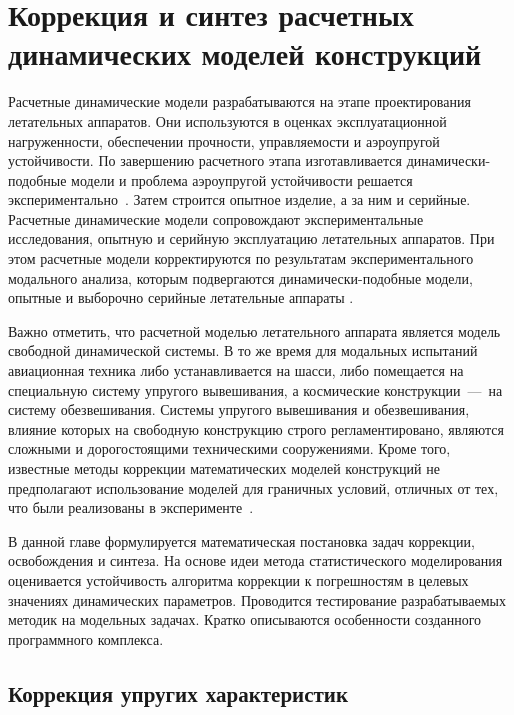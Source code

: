 \chapter{Коррекция и синтез расчетных динамических моделей конструкций}

Расчетные динамические модели разрабатываются на этапе проектирования летательных аппаратов. Они используются в оценках эксплуатационной нагруженности, обеспечении прочности, управляемости и аэроупругой устойчивости. По завершению расчетного этапа изготавливается динамически-подобные модели и проблема аэроупругой устойчивости решается экспериментально~\cite{lib:modelUpdating:Karklje:force}. Затем строится опытное изделие, а за ним и серийные. Расчетные динамические модели сопровождают экспериментальные исследования, опытную и серийную эксплуатацию летательных аппаратов. При этом расчетные модели корректируются по результатам экспериментального модального анализа, которым подвергаются динамически-подобные модели, опытные и выборочно серийные летательные аппараты \cite{lib:modelUpdating:Karklje:force, lib:modelUpdating:Berns:monophase}.

Важно отметить, что расчетной моделью летательного аппарата является модель свободной динамической системы. В то же время для модальных испытаний авиационная техника либо устанавливается на шасси, либо помещается на специальную систему упругого вывешивания, а космические конструкции~---~на систему обезвешивания. Системы упругого вывешивания и обезвешивания, влияние которых на свободную конструкцию строго регламентировано, являются сложными и дорогостоящими техническими сооружениями. Кроме того, известные методы коррекции математических моделей конструкций не предполагают использование моделей для граничных условий, отличных от тех, что были реализованы в эксперименте~\cite{lib:modelUpdating:Kuznecov, lib:modelUpdating:Luo, lib:modelUpdating:Jang, lib:modelUpdating:Asgarieh, lib:modelUpdating:Sanayei, lib:modelUpdating:Wang}.

В данной главе формулируется математическая постановка задач коррекции, освобождения и синтеза. На основе идеи метода статистического моделирования оценивается устойчивость алгоритма коррекции к погрешностям в целевых значениях динамических параметров. Проводится тестирование разрабатываемых методик на модельных задачах. Кратко описываются особенности созданного программного комплекса.

\section{Коррекция упругих характеристик} \label{struct:updating}

